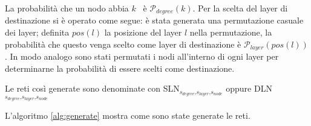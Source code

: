 La probabilità che un nodo abbia $k$ \interc\ è $\mathcal{P}_{degree}(k)$.
Per la scelta del layer di destinazione si è operato come segue:
è stata generata una permutazione casuale dei layer; definita $pos(l)$
la posizione del layer $l$ nella permutazione, la probabilità che questo venga 
scelto come layer di destinazione è $\mathcal{P}_{layer}(pos(l))$.
In modo analogo sono stati permutati i nodi all'interno di ogni layer per determinarne 
la probabilità di essere scelti come destinazione.

Le reti così generate sono denominate con 
SLN\large{$_{ s_{degree}\text{,}s_{layer}\text{,}s_{node}}$}
oppure
DLN\large{$_{ s_{degree}\text{,}s_{layer}\text{,}s_{node}}$}

L'algoritmo \vref{alg:generate} mostra come sono state generate le reti.


  

